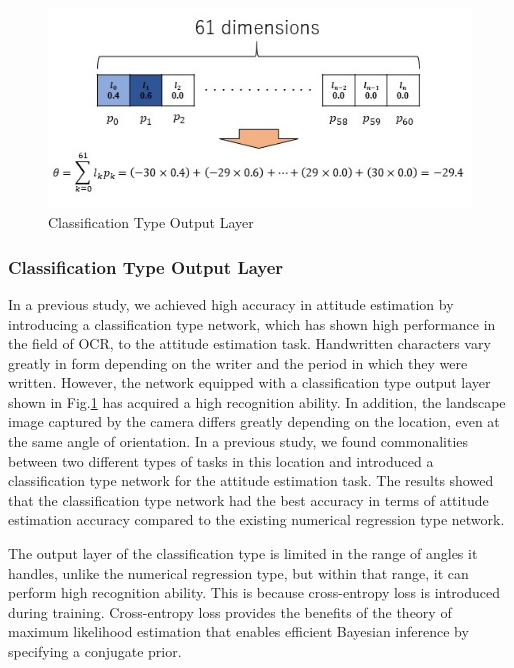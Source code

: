 \begin{figure}[thpb]
\centering
\includegraphics[scale=0.5]{./figure/2_method/classification_layer.jpg}
\caption{Classification Type Output Layer}
\label{fig:classification_layer}
\end{figure}

\subsubsection{Classification Type Output Layer}
In a previous study, we achieved high accuracy in attitude estimation by introducing a classification type network\cite{9708864}, which has shown high performance in the field of OCR\cite{kuzushiji_dl}, to the attitude estimation task. Handwritten characters vary greatly in form depending on the writer and the period in which they were written. However, the network equipped with a classification type output layer shown in Fig.\ref{fig:classification_layer} has acquired a high recognition ability. In addition, the landscape image captured by the camera differs greatly depending on the location, even at the same angle of orientation. In a previous study, we found commonalities between two different types of tasks in this location and introduced a classification type network for the attitude estimation task. The results showed that the classification type network had the best accuracy in terms of attitude estimation accuracy compared to the existing numerical regression type network.

The output layer of the classification type is limited in the range of angles it handles, unlike the numerical regression type, but within that range, it can perform high recognition ability. This is because cross-entropy loss is introduced during training. Cross-entropy loss provides the benefits of the theory of maximum likelihood estimation that enables efficient Bayesian inference by specifying a conjugate prior.

